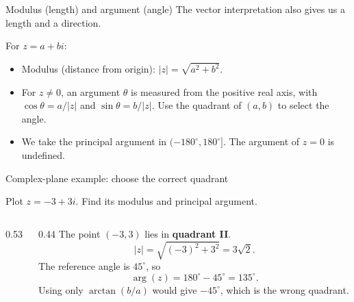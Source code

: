 \begin{frame}{Modulus (length) and argument (angle)}
The vector interpretation also gives us a length and a direction.
\begin{defn}{}{}
  For $z=a+bi$:
  \begin{itemize}
    \item Modulus (distance from origin): $|z| = \sqrt{a^2 + b^2}$.
    \item For $z\ne0$, an argument $\theta$ is measured from the positive real axis, with
    $\cos\theta=a/|z|$ and $\sin\theta=b/|z|$.
    Use the quadrant of $(a,b)$ to select the angle.
    \item We take the principal argument in $(-180^\circ,180^\circ]$.
    The argument of $z=0$ is undefined.
  \end{itemize}
  \end{defn}
\end{frame}
\begin{frame}[t]{Complex-plane example: choose the correct quadrant}
\begin{ex}
Plot $z=-3+3i$. Find its modulus and principal argument.
\end{ex}
\begin{columns}[c]
\begin{column}{0.53\textwidth}
\centering
{}
\end{column}
\begin{column}{0.44\textwidth}
\small
The point $(-3,3)$ lies in \textbf{quadrant II}.
\[
|z|=\sqrt{(-3)^2+3^2}=3\sqrt2.
\]
The reference angle is $45^\circ$, so
\[
\arg(z)=180^\circ-45^\circ=135^\circ.
\]
Using only $\arctan(b/a)$ would give $-45^\circ$, which is the wrong quadrant.
\end{column}
\end{columns}
\end{frame}


